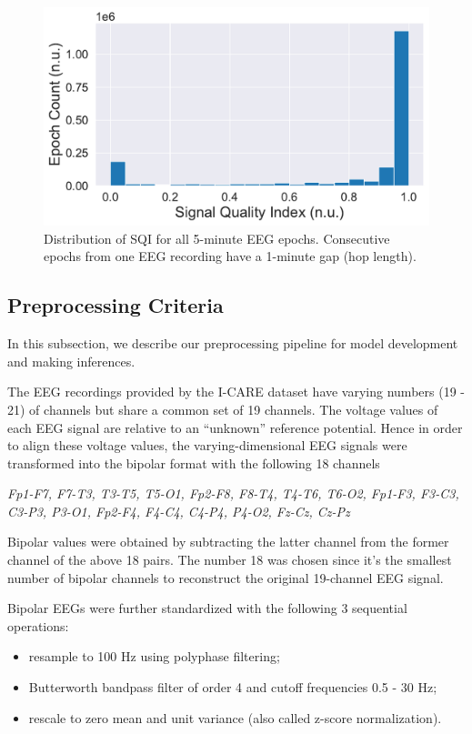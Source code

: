 \begin{figure}[!htp]
\centering
\includegraphics[width=0.95\linewidth]{images/sqi-stats.pdf}
\caption[]{Distribution of SQI for all 5-minute EEG epochs. Consecutive epochs from one EEG recording have a 1-minute gap (hop length).}
\label{fig:sqi-stats}
\end{figure}


\subsection{Preprocessing Criteria}
\label{subsec:data_preproc}

In this subsection, we describe our preprocessing pipeline for model development and making inferences.

The EEG recordings provided by the I-CARE dataset have varying numbers (19 - 21) of channels but share a common set of 19 channels. The voltage values of each EEG signal are relative to an ``unknown'' reference potential. Hence in order to align these voltage values, the varying-dimensional EEG signals were transformed into the bipolar format with the following 18 channels
\begin{indentedquote}{0.3in}
\it Fp1-F7, F7-T3, T3-T5, T5-O1, Fp2-F8, F8-T4, T4-T6, T6-O2, Fp1-F3, F3-C3, C3-P3, P3-O1, Fp2-F4, F4-C4, C4-P4, P4-O2, Fz-Cz, Cz-Pz
\end{indentedquote}
Bipolar values were obtained by subtracting the latter channel from the former channel of the above 18 pairs. The number 18 was chosen since it's the smallest number of bipolar channels to reconstruct the original 19-channel EEG signal.

Bipolar EEGs were further standardized with the following 3 sequential operations:
\begin{itemize}
    \item resample to 100 Hz using polyphase filtering;
    \item Butterworth bandpass filter of order 4 and cutoff frequencies 0.5 - 30 Hz;
    \item rescale to zero mean and unit variance (also called z-score normalization).
\end{itemize}

